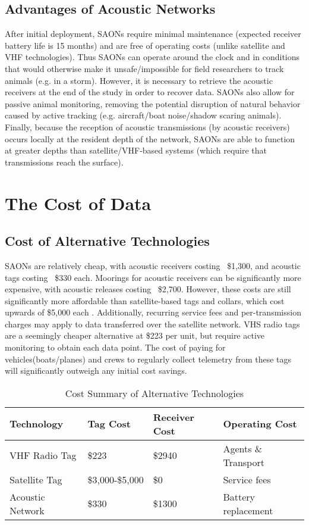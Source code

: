 \subsection{Advantages of Acoustic Networks}
After initial deployment, SAONs require minimal maintenance (expected receiver battery life is 15 months\cite{vemco})  and are free of operating costs (unlike satellite and VHF technologies).  Thus SAONs can operate around the clock and in conditions that would otherwise make it unsafe/impossible for field researchers to track animals (e.g. in a storm)\cite{Heupel2006}.  However, it is necessary to retrieve the acoustic receivers at the end of the study in order to recover data\cite{Heupel2006}.  SAONs also allow for passive animal monitoring, removing the potential disruption of natural behavior caused by active tracking (e.g. aircraft/boat noise/shadow scaring animals)\cite{Heupel2006}.  Finally, because the reception of acoustic transmissions (by acoustic receivers) occurs locally at the resident depth of the network,  SAONs are able to function at greater depths than satellite/VHF-based systems (which require that transmissions reach the surface).

\section{The Cost of Data}
\subsection{Cost of Alternative Technologies}
SAONs are relatively cheap, with acoustic receivers costing ~\$1,300, and acoustic tags costing ~\$330 each.  Moorings for acoustic receivers can be significantly more expensive, with acoustic releases costing ~\$2,700.  However, these costs are still significantly more affordable than satellite-based tags and collars, which cost upwards of \$5,000 each \cite{wildlifetracking}.  Additionally, recurring service fees and per-transmission charges may apply to data transferred over the satellite network.  VHS radio tags are a seemingly cheaper alternative at \$223 per unit, but require active monitoring to obtain each data point.  The cost of paying for vehicles(boats/planes) and crews to regularly collect telemetry from these tags will significantly outweigh any initial cost savings.

\begin{table}[h!]
		\begin{tabular}{l l l l}
Technology&Tag Cost&Receiver Cost&Operating Cost\\
\hline
			VHF Radio Tag		 & \$223\cite{telonicsFIS-550}           & \$2940\cite{telonicsTR-5}  & Agents \& Transport\\
			Satellite Tag 	     & \$3,000-\$5,000\cite{wildlifetracking}  & \$0    					  & Service fees\\
			Acoustic Network 	 & \$330         						 & \$1300 					  & Battery replacement\\
		\end{tabular}
		\caption{Cost Summary of Alternative Technologies
			\label{CostAltTech}}
\end{table}

